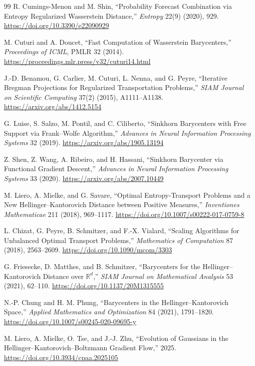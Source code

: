 \documentclass[11pt]{article}
\theoremstyle{definition}
\newcommand{\R}{\mathbb R}
\begin{document}
\begin{thebibliography}{99}
R. Cumings-Menon and M. Shin,
``Probability Forecast Combination via Entropy Regularized Wasserstein
Distance,''
\emph{Entropy} 22(9) (2020), 929.
\url{https://doi.org/10.3390/e22090929}

M. Cuturi and A. Doucet,
``Fast Computation of Wasserstein Barycenters,''
\emph{Proceedings of ICML}, PMLR 32 (2014).
\url{https://proceedings.mlr.press/v32/cuturi14.html}

J.-D. Benamou, G. Carlier, M. Cuturi, L. Nenna, and G. Peyre,
``Iterative Bregman Projections for Regularized Transportation Problems,''
\emph{SIAM Journal on Scientific Computing} 37(2) (2015), A1111--A1138.
\url{https://arxiv.org/abs/1412.5154}

G. Luise, S. Salzo, M. Pontil, and C. Ciliberto,
``Sinkhorn Barycenters with Free Support via Frank--Wolfe Algorithm,''
\emph{Advances in Neural Information Processing Systems} 32 (2019).
\url{https://arxiv.org/abs/1905.13194}

Z. Shen, Z. Wang, A. Ribeiro, and H. Hassani,
``Sinkhorn Barycenter via Functional Gradient Descent,''
\emph{Advances in Neural Information Processing Systems} 33 (2020).
\url{https://arxiv.org/abs/2007.10449}

M. Liero, A. Mielke, and G. Savare,
``Optimal Entropy-Transport Problems and a New Hellinger--Kantorovich Distance
between Positive Measures,''
\emph{Inventiones Mathematicae} 211 (2018), 969--1117.
\url{https://doi.org/10.1007/s00222-017-0759-8}

L. Chizat, G. Peyre, B. Schmitzer, and F.-X. Vialard,
``Scaling Algorithms for Unbalanced Optimal Transport Problems,''
\emph{Mathematics of Computation} 87 (2018), 2563--2609.
\url{https://doi.org/10.1090/mcom/3303}

G. Friesecke, D. Matthes, and B. Schmitzer,
``Barycenters for the Hellinger--Kantorovich Distance over $\R^d$,''
\emph{SIAM Journal on Mathematical Analysis} 53 (2021), 62--110.
\url{https://doi.org/10.1137/20M1315555}

N.-P. Chung and H. M. Phung,
``Barycenters in the Hellinger--Kantorovich Space,''
\emph{Applied Mathematics and Optimization} 84 (2021), 1791--1820.
\url{https://doi.org/10.1007/s00245-020-09695-y}

M. Liero, A. Mielke, O. Tse, and J.-J. Zhu,
``Evolution of Gaussians in the Hellinger--Kantorovich--Boltzmann Gradient
Flow,'' 2025.
\url{https://doi.org/10.3934/cpaa.2025105}


\end{thebibliography}
\end{document}
